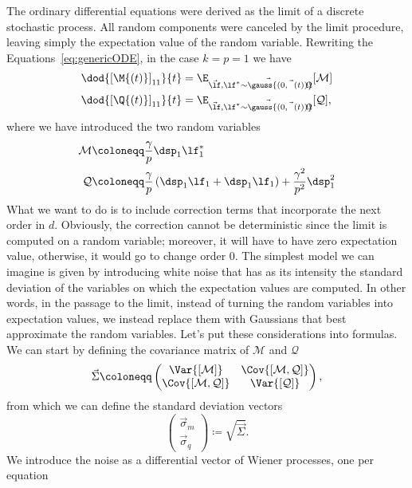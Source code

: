 The ordinary differential equations were derived as the limit of a discrete stochastic process.
All random components were canceled by the limit procedure, leaving simply the expectation value of the random variable.
Rewriting the Equations~\eqref{eq:genericODE}, in the case \(k=p=1\) we have 
\[\begin{split}
  \dod{\left[\M{\left(t\right)}\right]_{11}}{t} &=\E_{\vec{\lf},\vec{\lf^* \sim \gauss{(0,\vec{\Omega}{(t)})}}}{\left[\mathcal{M}\right]} \\
  \dod{\left[\Q{\left(t\right)}\right]_{11}}{t} &=\E_{\vec{\lf},\vec{\lf^* \sim \gauss{(0,\vec{\Omega}{(t)})}}}{\left[\mathcal{Q}\right]},
\end{split}\]
where we have introduced the two random variables
\[\begin{split}
  \mathcal{M} \coloneqq &  \frac{\gamma}{p} \dsp_1 \lf_1^* \\
  \mathcal{Q} \coloneqq &  \frac{\gamma}{p}\left(\dsp_1 \lf_1 + \dsp_1 \lf_1\right) + \frac{\gamma^2}{p^2} \dsp_1^2
\end{split}\]
What we want to do is to include correction terms that incorporate the next order in \(d\).
Obviously, the correction cannot be deterministic since the limit is computed on a random variable;
moreover, it will have to have zero expectation value, otherwise, it would go to change order 0.
The simplest model we can imagine is given by introducing white noise that has as its intensity the standard deviation of the variables on which the expectation values are computed.
In other words, in the passage to the limit, instead of turning the random variables into expectation values,
we instead replace them with Gaussians that best approximate the random variables.
Let's put these considerations into formulas. We can start by defining the covariance matrix of \(\mathcal{M}\)
and \(\mathcal{Q}\)
\[
  \vec{\Sigma} \coloneqq 
  \begin{pmatrix}
    \Var{\left[\mathcal{M}\right]} & \Cov{\left[\mathcal{M},\mathcal{Q}\right]} \\
    \Cov{\left[\mathcal{M},\mathcal{Q}\right]} & \Var{\left[\mathcal{Q}\right]}
  \end{pmatrix},
\]
from which we can define the standard deviation vectors
\[
  \begin{pmatrix}
    \vec{\sigma}_m \\
    \vec{\sigma}_q
  \end{pmatrix}
  \coloneqq
  \sqrt{\vec{\Sigma}}.
\]
We introduce the noise as a differential vector of Wiener processes, one per equation
